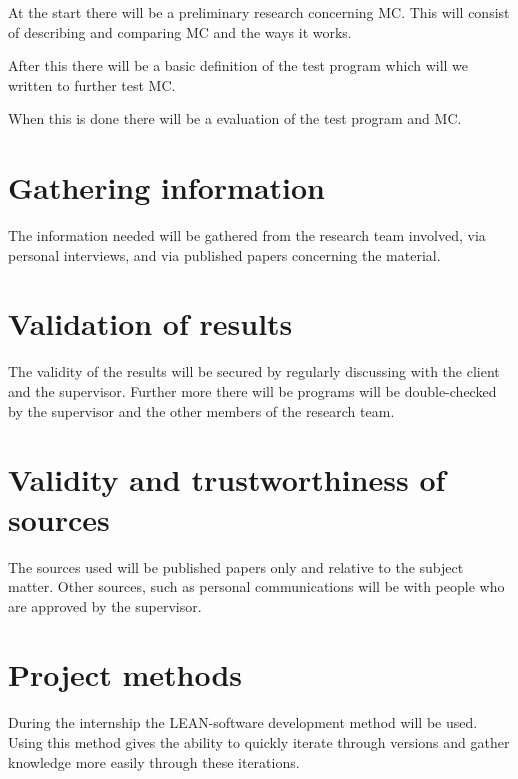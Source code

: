 At the start there will be a preliminary research concerning MC.
This will consist of describing and comparing MC and the ways it works.

After this there will be a basic definition of the test program which will we written to further test MC.

When this is done there will be a evaluation of the test program and MC.

\section{Gathering information}
The information needed will be gathered from the research team involved, via personal interviews, and via published papers concerning the material.

\section{Validation of results}
The validity of the results will be secured by regularly discussing with the client and the supervisor.
Further more there will be programs will be double-checked by the supervisor and the other members of the research team.

\section{Validity and trustworthiness of sources}
The sources used will be published papers only and relative to the subject matter.
Other sources, such as personal communications will be with people who are approved by the supervisor.

\section{Project methods}
During the internship the LEAN-software development method will be used\cite{ries2011lean}.
Using this method gives the ability to quickly iterate through versions and gather knowledge more easily through these iterations.

